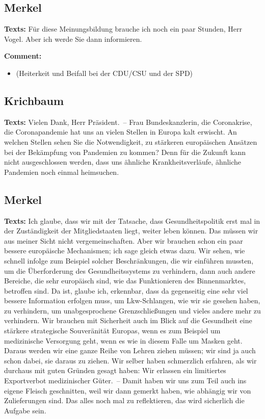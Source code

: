 \documentclass{article}
\begin{document}
\subsection{Merkel}
\noindent\textbf{Texts:} Für diese Meinungsbildung brauche ich noch ein paar Stunden, Herr Vogel. Aber ich werde Sie dann informieren. 

\noindent\textbf{Comment:}
\begin{itemize}
    \setlength\itemsep{-3pt}
    \item (Heiterkeit und Beifall bei der CDU/CSU und der SPD)
\end{itemize}
\subsection{Krichbaum}
\noindent\textbf{Texts:} Vielen Dank, Herr Präsident. – Frau Bundeskanzlerin, die Coronakrise, die Coronapandemie hat uns an vielen Stellen in Europa kalt erwischt. An welchen Stellen sehen Sie die Notwendigkeit, zu stärkeren europäischen Ansätzen bei der Bekämpfung von Pandemien zu kommen? Denn für die Zukunft kann nicht ausgeschlossen werden, dass uns ähnliche Krankheitsverläufe, ähnliche Pandemien noch einmal heimsuchen.

\subsection{Merkel}
\noindent\textbf{Texts:} Ich glaube, dass wir mit der Tatsache, dass Gesundheitspolitik erst mal in der Zuständigkeit der Mitgliedstaaten liegt, weiter leben können. Das müssen wir aus meiner Sicht nicht vergemeinschaften. Aber wir brauchen schon ein paar bessere europäische Mechanismen; ich sage gleich etwas dazu. Wir sehen, wie schnell infolge zum Beispiel solcher Beschränkungen, die wir einführen mussten, um die Überforderung des Gesundheitssystems zu verhindern, dann auch andere Bereiche, die sehr europäisch sind, wie das Funktionieren des Binnenmarktes, betroffen sind. Da ist, glaube ich, erkennbar, dass da gegenseitig eine sehr viel bessere Information erfolgen muss, um Lkw-Schlangen, wie wir sie gesehen haben, zu verhindern, um unabgesprochene Grenzschließungen und vieles andere mehr zu verhindern. Wir brauchen mit Sicherheit auch im Blick auf die Gesundheit eine stärkere strategische Souveränität Europas, wenn es zum Beispiel um medizinische Versorgung geht, wenn es wie in diesem Falle um Masken geht. Daraus werden wir eine ganze Reihe von Lehren ziehen müssen; wir sind ja auch schon dabei, sie daraus zu ziehen. Wir selber haben schmerzlich erfahren, als wir durchaus mit guten Gründen gesagt haben: Wir erlassen ein limitiertes Exportverbot medizinischer Güter. – Damit haben wir uns zum Teil auch ins eigene Fleisch geschnitten, weil wir dann gemerkt haben, wie abhängig wir von Zulieferungen sind. Das alles noch mal zu reflektieren, das wird sicherlich die Aufgabe sein.
\end{document}
